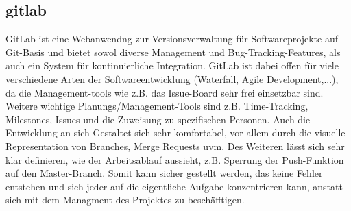 \subsection{gitlab}
GitLab ist eine Webanwendng zur Versionsverwaltung für Softwareprojekte auf Git-Basis und bietet sowol diverse Management und Bug-Tracking-Features, als auch ein System für kontinuierliche Integration. GitLab ist dabei offen für viele verschiedene Arten der Softwareentwicklung (Waterfall, Agile Development,...), da die Management-tools wie z.B. das Issue-Board sehr frei einsetzbar sind. Weitere wichtige Planungs/Management-Tools sind z.B. Time-Tracking, Milestones, Issues und die Zuweisung zu spezifischen Personen. Auch die Entwicklung an sich Gestaltet sich sehr komfortabel, vor allem durch die visuelle Representation von Branches, Merge Requests uvm. Des Weiteren lässt sich sehr klar definieren, wie der Arbeitsablauf aussieht, z.B. Sperrung der Push-Funktion auf den Master-Branch. Somit kann sicher gestellt werden, das keine Fehler entstehen und sich jeder auf die eigentliche Aufgabe konzentrieren kann, anstatt sich mit dem Managment des Projektes zu beschäfftigen.
\cite{gitlabwiki}	
